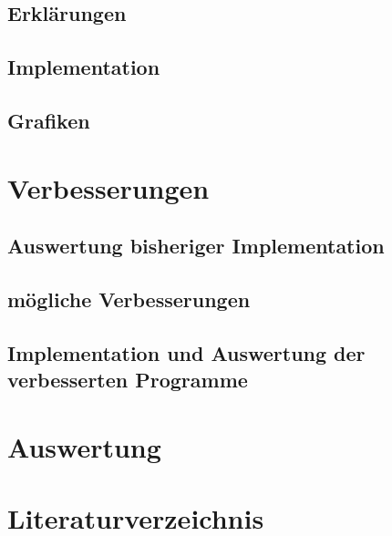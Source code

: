 \documentclass[ngerman,BCOR=4mm]{tudscrreprt}
\theoremstyle{plain} %
\theoremstyle{definition} %
\theoremstyle{remark}
\begin{document}
      \section{Erklärungen}

      \section{Implementation}

      \section{Grafiken}

\chapter{Verbesserungen}
\label{sec: Verbesserungen}
      \section{Auswertung bisheriger Implementation}

      \section{mögliche Verbesserungen}

      \section{Implementation und Auswertung der verbesserten Programme}

\chapter{Auswertung}
\label{sec: Auswertung}

\chapter{Literaturverzeichnis}


      \printbibliography
\end{document}
